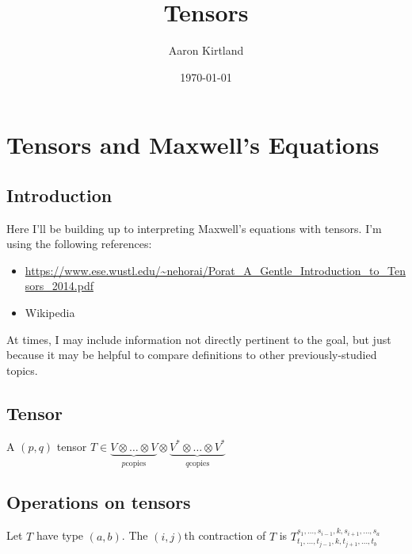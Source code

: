 \documentclass[12pt,letterpaper,titlepage,twoside]{article}
\begin{document}
\title{Tensors}
\author{Aaron Kirtland}
\date{\today}
\titlepage{}
\tableofcontents

\section{Tensors and Maxwell's Equations}

\subsection{Introduction}

Here I'll be building up to interpreting Maxwell's equations with tensors.
I'm using the following references:

\begin{itemize}
  \item \url{https://www.ese.wustl.edu/~nehorai/Porat_A_Gentle_Introduction_to_Tensors_2014.pdf}
  \item Wikipedia
\end{itemize}

At times, I may include information not directly pertinent to the goal, but just because it may be helpful to compare definitions to other previously-studied topics.

\subsection{Tensor}

\begin{definition}[tensor]
A $(p,q)$ tensor $T∈ \underbrace{V⊗ … ⊗ V}_{p\text{copies}} ⊗ \underbrace{V^* ⊗ … ⊗ V^*}_{q \text{copies}}$
\end{definition}

\subsection{Operations on tensors}

\begin{definition}[contraction]
Let $T$ have type $(a,b)$.
The $(i,j)$th contraction of $T$ is $T_{t_1,…,t_{j-1},k,t_{j+1},…,t_b}^{s_1,…,s_{i-1},k,s_{i+1},…,s_a}$
\end{definition}

\begin{definition}
\end{definition}
\end{document}
